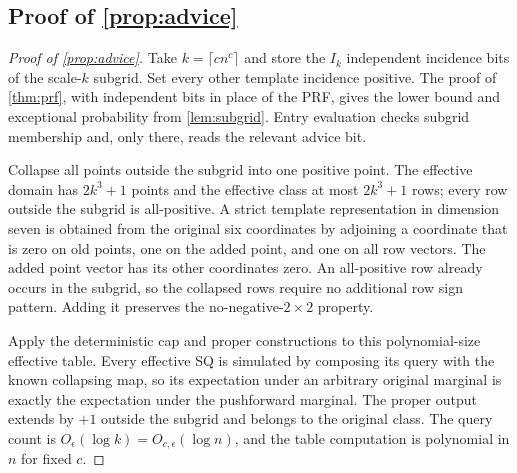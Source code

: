 \subsection[Polynomial advice]{Proof of \cref{prop:advice}}\label{proof:advice}
\begin{proof}[Proof of \cref{prop:advice}]

Take $k=\lceil cn^c\rceil$ and store the $I_k$ independent incidence bits of the scale-$k$ subgrid. Set every other template incidence positive. The proof of \cref{thm:prf}, with independent bits in place of the PRF, gives the lower bound and exceptional probability from \cref{lem:subgrid}. Entry evaluation checks subgrid membership and, only there, reads the relevant advice bit.

Collapse all points outside the subgrid into one positive point. The effective domain has $2k^3+1$ points and the effective class at most $2k^3+1$ rows; every row outside the subgrid is all-positive. A strict template representation in dimension seven is obtained from the original six coordinates by adjoining a coordinate that is zero on old points, one on the added point, and one on all row vectors. The added point vector has its other coordinates zero. An all-positive row already occurs in the subgrid, so the collapsed rows require no additional row sign pattern. Adding it preserves the no-negative-$2\times2$ property.

Apply the deterministic cap and proper constructions to this polynomial-size effective table. Every effective SQ is simulated by composing its query with the known collapsing map, so its expectation under an arbitrary original marginal is exactly the expectation under the pushforward marginal. The proper output extends by $+1$ outside the subgrid and belongs to the original class. The query count is $O_\epsilon(\log k)=O_{c,\epsilon}(\log n)$, and the table computation is polynomial in $n$ for fixed $c$.

\end{proof}
